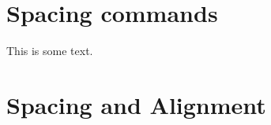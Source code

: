 \documentclass[12pt]{article}
\begin{document}
\section{Spacing commands}
\lipsum[1]
	
\vspace{2cm}
\lipsum[2]

This \hspace{2cm} is some text.
\pagebreak
\section{Spacing and Alignment}
\lipsum[1]

\raggedright
\lipsum[3]

\justifying

\lipsum[4]
\end{document}
